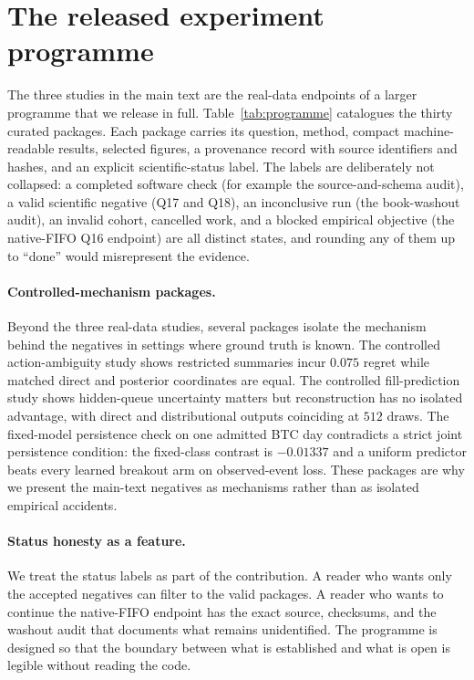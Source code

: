 \section{The released experiment programme}
\label{app:programme}

The three studies in the main text are the real-data endpoints of a larger programme that
we release in full. Table~\ref{tab:programme} catalogues the thirty curated packages. Each
package carries its question, method, compact machine-readable results, selected figures, a
provenance record with source identifiers and hashes, and an explicit scientific-status
label. The labels are deliberately not collapsed: a completed software check (for example
the source-and-schema audit), a valid scientific negative (Q17 and Q18), an inconclusive run
(the book-washout audit), an invalid cohort, cancelled work, and a blocked empirical
objective (the native-FIFO Q16 endpoint) are all distinct states, and rounding any of them up
to ``done'' would misrepresent the evidence.



\paragraph{Controlled-mechanism packages.} Beyond the three real-data studies, several
packages isolate the mechanism behind the negatives in settings where ground truth is known.
The controlled action-ambiguity study shows restricted summaries incur $0.075$ regret while
matched direct and posterior coordinates are equal. The controlled fill-prediction study
shows hidden-queue uncertainty matters but reconstruction has no isolated advantage, with
direct and distributional outputs coinciding at $512$ draws. The fixed-model persistence
check on one admitted BTC day contradicts a strict joint persistence condition: the
fixed-class contrast is $-0.01337$ and a uniform predictor beats every learned breakout arm on
observed-event loss. These packages are why we present the main-text negatives as mechanisms
rather than as isolated empirical accidents.

\paragraph{Status honesty as a feature.} We treat the status labels as part of the
contribution. A reader who wants only the accepted negatives can filter to the valid
packages. A reader who wants to continue the native-FIFO endpoint has the exact source,
checksums, and the washout audit that documents what remains unidentified. The programme is
designed so that the boundary between what is established and what is open is legible without
reading the code.
